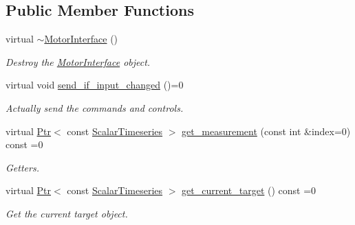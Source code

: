 \subsection*{Public Member Functions}
\begin{DoxyCompactItemize}
\item 
\mbox{\label{classblmc__drivers_1_1MotorInterface_a1f535a7de62ae8246f44541216254da5}} 
virtual \hyperlink{classblmc__drivers_1_1MotorInterface_a1f535a7de62ae8246f44541216254da5}{$\sim$\+Motor\+Interface} ()
\begin{DoxyCompactList}\small\item\em Destroy the \hyperlink{classblmc__drivers_1_1MotorInterface}{Motor\+Interface} object. \end{DoxyCompactList}\item 
\mbox{\label{classblmc__drivers_1_1MotorInterface_a7ac16ddd18d76781612714a485dcb6bd}} 
virtual void \hyperlink{classblmc__drivers_1_1MotorInterface_a7ac16ddd18d76781612714a485dcb6bd}{send\+\_\+if\+\_\+input\+\_\+changed} ()=0
\begin{DoxyCompactList}\small\item\em Actually send the commands and controls. \end{DoxyCompactList}\item 
virtual \hyperlink{classblmc__drivers_1_1MotorInterface_ae31f230b9da3674a05543023c90b124c}{Ptr}$<$ const \hyperlink{classblmc__drivers_1_1MotorInterface_a49b8fc916b9f9debbd7b0988463db5cd}{Scalar\+Timeseries} $>$ \hyperlink{classblmc__drivers_1_1MotorInterface_a7f6afed670f078518ccb46e1e3b44892}{get\+\_\+measurement} (const int \&index=0) const =0
\begin{DoxyCompactList}\small\item\em Getters. \end{DoxyCompactList}\item 
virtual \hyperlink{classblmc__drivers_1_1MotorInterface_ae31f230b9da3674a05543023c90b124c}{Ptr}$<$ const \hyperlink{classblmc__drivers_1_1MotorInterface_a49b8fc916b9f9debbd7b0988463db5cd}{Scalar\+Timeseries} $>$ \hyperlink{classblmc__drivers_1_1MotorInterface_a167ffe5df0412b9abcac9a93861e58d2}{get\+\_\+current\+\_\+target} () const =0
\begin{DoxyCompactList}\small\item\em Get the current target object. \end{DoxyCompactList}\item 

\end{DoxyCompactItemize}
